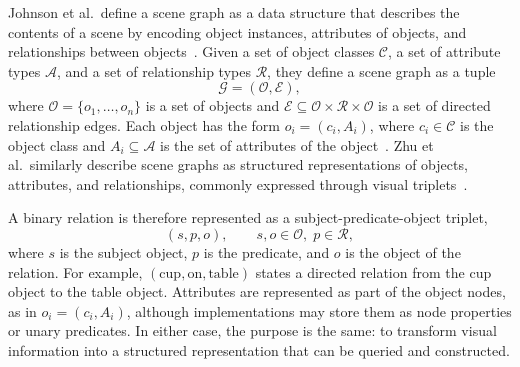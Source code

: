 Johnson et al.\ define a scene graph as a data structure that describes the contents of a scene by encoding object instances, attributes of objects, and relationships between objects~\cite[3668--3669]{johnson_image_2015}. Given a set of object classes \(\mathcal{C}\), a set of attribute types \(\mathcal{A}\), and a set of relationship types \(\mathcal{R}\), they define a scene graph as a tuple
\[
\mathcal{G}=(\mathcal{O},\mathcal{E}),
\]
where \(\mathcal{O}=\{o_1,\ldots,o_n\}\) is a set of objects and \(\mathcal{E}\subseteq \mathcal{O}\times\mathcal{R}\times\mathcal{O}\) is a set of directed relationship edges. Each object has the form \(o_i=(c_i,A_i)\), where \(c_i\in\mathcal{C}\) is the object class and \(A_i\subseteq\mathcal{A}\) is the set of attributes of the object~\cite[3669]{johnson_image_2015}. Zhu et al.\ similarly describe scene graphs as structured representations of objects, attributes, and relationships, commonly expressed through visual triplets~\cite{zhu_scene_2022}.




A binary relation is therefore represented as a subject-predicate-object triplet,
\[
(s,p,o),\qquad s,o\in\mathcal{O},\; p\in\mathcal{R},
\]
where \(s\) is the subject object, \(p\) is the predicate, and \(o\) is the object of the relation. For example, \((\text{cup},\text{on},\text{table})\) states a directed relation from the cup object to the table object. Attributes are represented as part of the object nodes, as in \(o_i=(c_i,A_i)\), although implementations may store them as node properties or unary predicates. In either case, the purpose is the same: to transform visual information into a structured representation that can be queried and constructed.


